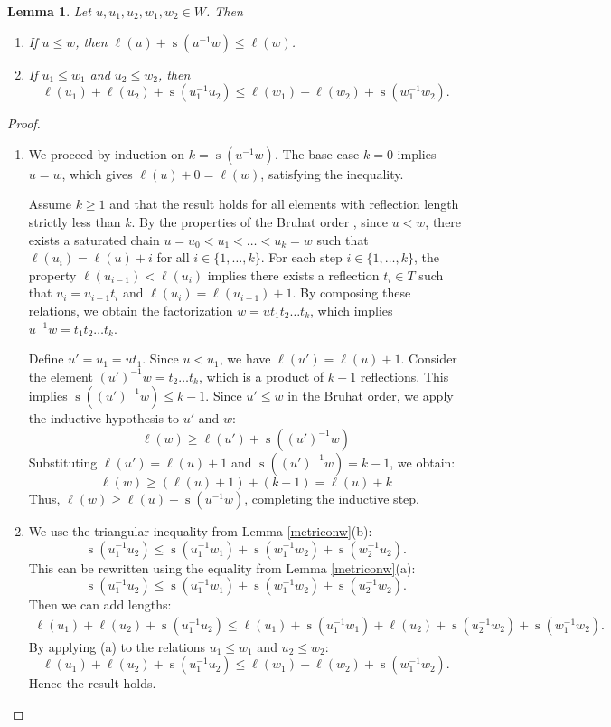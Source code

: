 \documentclass[11pt]{article}
\newtheorem{lemma}[equation]{Lemma}
\theoremstyle{definition}
\numberwithin{equation}{section}
\DeclareMathOperator{\si}{\mathrm{s}}
\begin{document}
	\begin{lemma}\label{smalllenghtpro} Let $u, u_1, u_2, w_1, w_2\in W$. Then 
		\begin{enumerate}
			\item[(a)] If $u\le w$, then $\ell(u)+ \si(u^{-1}w)\le\ell(w)$.
			\item[(b)] If $u_1\le w_1$ and $u_2\le w_2$, then 
			$$\ell(u_1)+ \ell(u_2)+ \si(u_1^{-1}u_2)\le\ell(w_1)+ \ell(w_2)+ \si(w_1^{-1}w_2).$$
		\end{enumerate} 
	\end{lemma}
	\begin{proof}
		\begin{enumerate}
			\item[(a)] 
				We proceed by induction on $k = \si(u^{-1}w)$. 
				The base case $k=0$ implies $u=w$, which gives $\ell(u) + 0 = \ell(w)$, satisfying the inequality.
				
				Assume $k \ge 1$ and that the result holds for all elements with reflection length strictly less than $k$. 
				By the properties of the Bruhat order \cite[Theorem 2.2.6]{BB05}, since $u< w$, there exists a saturated chain $u = u_0 < u_1 < \dots < u_k = w$ such that $\ell(u_i) = \ell(u) + i$ for all $i \in \{1, \dots, k\}$. 
				For each step $i \in \{1, \dots, k\}$, the property $\ell(u_{i-1}) < \ell(u_i)$ implies there exists a reflection $t_i \in T$ such that $u_i = u_{i-1}t_i$ and $\ell(u_i) = \ell(u_{i-1}) + 1$. 
				By composing these relations, we obtain the factorization $w = u t_1 t_2 \dots t_k$, which implies $u^{-1}w = t_1 t_2 \dots t_k$.
				
				Define $u' = u_1 = u t_1$. Since $u < u_1$, we have $\ell(u') = \ell(u) + 1$. 
				Consider the element $(u')^{-1}w = t_2 \dots t_k$, which is a product of $k-1$ reflections. This implies $\si((u')^{-1}w) \le k - 1$. 
				Since $u' \le w$ in the Bruhat order, we apply the inductive hypothesis to $u'$ and $w$:
				 $$\ell(w) \ge \ell(u') + \si((u')^{-1}w)$$
				Substituting $\ell(u') = \ell(u) + 1$ and $\si((u')^{-1}w) = k-1$, we obtain:
				\[ \ell(w) \ge (\ell(u) + 1) + (k - 1) = \ell(u) + k \]
				Thus, $\ell(w) \ge \ell(u) + \si(u^{-1}w)$, completing the inductive step.
			
			
			\item [(b)] We use the triangular inequality from Lemma \ref{metriconw}(b):
			$$\si(u_1^{-1}u_2)\le\si(u_1^{-1}w_1)+ \si(w_1^{-1}w_2)+ \si(w_2^{-1}u_2).$$
			This can be rewritten using the equality from Lemma \ref{metriconw}(a):
			$$\si(u_1^{-1}u_2)\le\si(u_1^{-1}w_1)+ \si(w_1^{-1}w_2)+ \si(u_2^{-1}w_2).$$
			Then we can add lengths:
			\begin{align*}
				\ell(u_1)+ \ell(u_2)+ \si(u_1^{-1}u_2)\le\ell(u_1)+ \si(u_1^{-1}w_1)+ \ell(u_2)+ \si(u_2^{-1}w_2)+ \si(w_1^{-1}w_2).
			\end{align*}
			By applying (a) to the relations  $u_1\leq w_1$ and $u_2\leq w_2$:
			$$	\ell(u_1)+ \ell(u_2)+ \si(u_1^{-1}u_2)\le \ell(w_1)+ \ell(w_2)+ \si(w_1^{-1}w_2).$$
			Hence the result holds.
		\end{enumerate}
	\end{proof}
	
\end{document}
